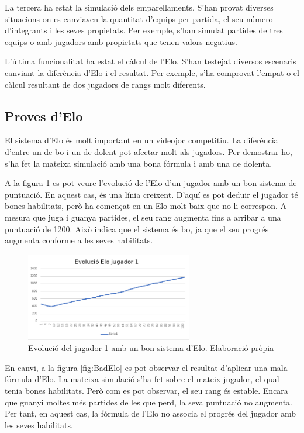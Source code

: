 \documentclass[a4paper]{article}
\begin{document}
La tercera ha estat la simulació dels emparellaments. S'han provat diverses situacions on es canviaven la quantitat d'equips per partida, el seu número d'integrants i les seves propietats. Per exemple, s'han simulat partides de tres equips o amb jugadors amb propietats que tenen valors negatius.

L'última funcionalitat ha estat el càlcul de l'Elo. S'han testejat diversos escenaris canviant la diferència d'Elo i el resultat. Per exemple, s'ha comprovat l'empat o el càlcul resultant de dos jugadors de rangs molt diferents.

\subsection{Proves d'Elo}
El sistema d'Elo és molt important en un videojoc competitiu. La diferència d'entre un de bo i un de dolent pot afectar molt als jugadors. Per demostrar-ho, s'ha fet la mateixa simulació amb una bona fórmula i amb una de dolenta.

A la figura \ref{fig:EloBo} es pot veure l'evolució de l'Elo d'un jugador amb un bon sistema de puntuació. En aquest cas, és una línia creixent. D'aquí es pot deduir el jugador té bones habilitats, però ha començat en un Elo molt baix que no li correspon. A mesura que juga i guanya partides, el seu rang augmenta fins a arribar a una puntuació de 1200. Això indica que el sistema és bo, ja que el seu progrés augmenta conforme a les seves habilitats.

\begin{figure}[H]
    \centering
    \includegraphics[width=0.65\textwidth]{images/PlayerEloBo.png}
    \caption{Evolució del jugador 1 amb un bon sistema d'Elo. Elaboració pròpia}
    \label{fig:EloBo}
\end{figure}

En canvi, a la figura \ref{fig:BadElo} es pot observar el resultat d'aplicar una mala fórmula d'Elo. La mateixa simulació s'ha fet sobre el mateix jugador, el qual tenia bones habilitats. Però com es pot observar, el seu rang és estable. Encara que guanyi moltes més partides de les que perd, la seva puntuació no augmenta. Per tant, en aquest cas, la fórmula de l'Elo no associa el progrés del jugador amb les seves habilitats.
\end{document}
